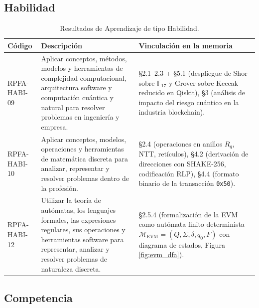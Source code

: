 \subsection*{Habilidad}

\begin{table}[htbp]
\centering
\caption{Resultados de Aprendizaje de tipo Habilidad.}
\label{tab:ra_habi}
\renewcommand{\arraystretch}{1.35}
\begin{tabular}{@{}>{\raggedright\arraybackslash}p{2.6cm}>{\raggedright\arraybackslash}p{5.8cm}>{\raggedright\arraybackslash}p{6.2cm}@{}}
\toprule
\textbf{Código} & \textbf{Descripción} & \textbf{Vinculación en la memoria} \\
\midrule
RPFA-HABI-09 & Aplicar conceptos, métodos, modelos y herramientas de complejidad computacional, arquitectura software y computación cuántica y natural para resolver problemas en ingeniería y empresa. & §2.1--2.3 + §5.1 (despliegue de Shor sobre $\mathbb{F}_{17}$ y Grover sobre Keccak reducido en Qiskit), §3 (análisis de impacto del riesgo cuántico en la industria blockchain). \\
\addlinespace
RPFA-HABI-10 & Aplicar conceptos, modelos, operaciones y herramientas de matemática discreta para analizar, representar y resolver problemas dentro de la profesión. & §2.4 (operaciones en anillos $R_q$, NTT, retículos), §4.2 (derivación de direcciones con SHAKE-256, codificación RLP), §4.4 (formato binario de la transacción \texttt{0x50}). \\
\addlinespace
RPFA-HABI-12 & Utilizar la teoría de autómatas, los lenguajes formales, las expresiones regulares, sus operaciones y herramientas software para representar, analizar y resolver problemas de naturaleza discreta. & §2.5.4 (formalización de la EVM como autómata finito determinista $\mathcal{M}_{\text{EVM}} = (Q, \Sigma, \delta, q_0, F)$ con diagrama de estados, Figura \ref{fig:evm_dfa}). \\
\bottomrule
\end{tabular}
\end{table}

\subsection*{Competencia}

